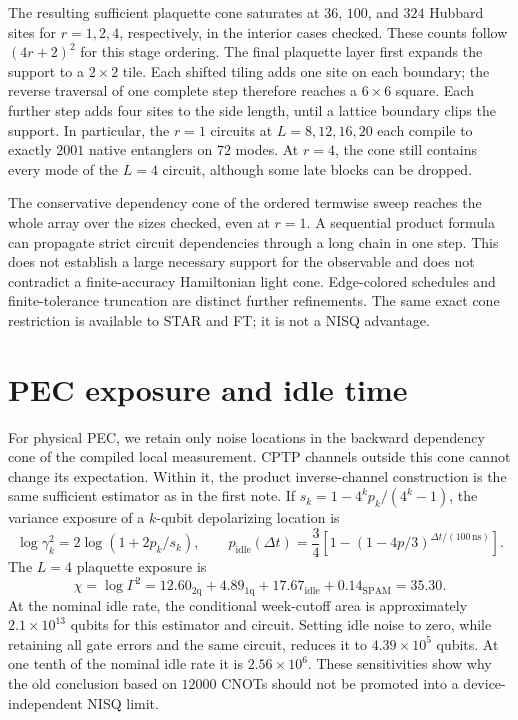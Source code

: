\documentclass[11pt]{article}
\begin{document}
The resulting sufficient plaquette cone saturates at $36$, $100$, and $324$
Hubbard sites for $r=1,2,4$, respectively, in the interior cases checked.
These counts follow $(4r+2)^2$ for this stage ordering. The final plaquette
layer first expands the support to a $2\times2$ tile. Each shifted tiling
adds one site on each boundary; the reverse traversal of one complete step
therefore reaches a $6\times6$ square. Each further step adds four sites to
the side length, until a lattice boundary clips the support. In particular, the
$r=1$ circuits at $L=8,12,16,20$ each compile to exactly $2001$ native
entanglers on $72$ modes. At $r=4$, the cone still contains every mode of
the $L=4$ circuit, although some late blocks can be dropped.

The conservative dependency cone of the ordered termwise sweep reaches the
whole array over the sizes checked, even at $r=1$. A sequential product formula
can propagate strict circuit dependencies through a long chain in one step.
This does not establish a large necessary support for the observable and does
not contradict a finite-accuracy Hamiltonian light cone. Edge-colored schedules
and finite-tolerance truncation are distinct further refinements. The same
exact cone restriction is available to STAR and FT; it is not a NISQ advantage.

\section{PEC exposure and idle time}
For physical PEC, we retain only noise locations in the backward dependency
cone of the compiled local measurement. CPTP channels outside this cone cannot
change its expectation. Within it, the product inverse-channel construction
is the same sufficient estimator as in the first note. If $s_k=1-4^kp_k/(4^k-1)$,
the variance exposure of a $k$-qubit depolarizing location is
\begin{equation}
 \log\gamma_k^2=2\log(1+2p_k/s_k),\qquad
 p_{\mathrm{idle}}(\Delta t)=\frac34\left[1-
 (1-4p/3)^{\Delta t/(100\,\mathrm{ns})}\right].
\end{equation}
The $L=4$ plaquette exposure is
\begin{equation}
 \chi=\log\Gamma^2=12.60_{\mathrm{2q}}+4.89_{\mathrm{1q}}
                  +17.67_{\mathrm{idle}}+0.14_{\mathrm{SPAM}}=35.30.
\end{equation}
At the nominal idle rate, the conditional week-cutoff area is approximately
$2.1\times10^{13}$ qubits for this estimator and circuit. Setting idle noise
to zero, while retaining all gate errors and the same circuit, reduces it to
$4.39\times10^5$ qubits. At one tenth of the nominal idle rate it is
$2.56\times10^6$. These sensitivities show why the old conclusion based on
$12000$ CNOTs should not be promoted into a device-independent NISQ limit.
\end{document}
